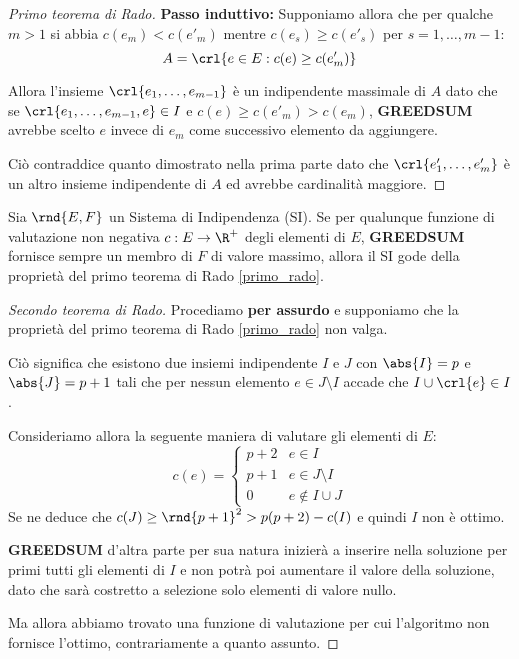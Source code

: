 \documentclass[\main/main.tex]{subfiles}
\begin{document}
\begin{proof}[Primo teorema di Rado]
  \textbf{Passo induttivo:} Supponiamo allora che per qualche \(m>1\) si abbia \(c(e_m) < c(e'_m)\) mentre \(c(e_s) \geq c(e'_s)\) per \(s = 1, \ldots, m-1\):
  \[A = \crl{e \in E: c(e) \geq c(e'_m)}\]

  Allora l'insieme \(\crl{e_1, \ldots, e_{m-1}}\) è un indipendente massimale di \(A\) dato che se \(\crl{e_1, \ldots, e_{m-1}, e} \in I\) e \(c(e) \geq c(e'_m) > c(e_m)\), \textbf{GREEDSUM} avrebbe scelto \(e\) invece di \(e_m\) come successivo elemento da aggiungere.

  Ciò contraddice quanto dimostrato nella prima parte dato che \(\crl{e'_1, \ldots, e'_m}\) è un altro insieme indipendente di \(A\) ed avrebbe cardinalità maggiore.
\end{proof}
\begin{theorem}
  Sia \(\rnd{E, F}\) un Sistema di Indipendenza (SI). Se per qualunque funzione di valutazione non negativa \(c: E \rightarrow \R^+\) degli elementi di \(E\), \textbf{GREEDSUM} fornisce sempre un membro di \(F\) di valore massimo, allora il SI gode della proprietà del primo teorema di Rado \ref{primo_rado}.
\end{theorem}
\begin{proof}[Secondo teorema di Rado]
  Procediamo \textbf{per assurdo} e supponiamo che la proprietà del primo teorema di Rado \ref{primo_rado} non valga.

  Ciò significa che esistono due insiemi indipendente \(I\) e \(J\) con \(\abs{I} = p\) e \(\abs{J} = p+1\) tali che per nessun elemento \(e \in J \setminus I\) accade che \(I \cup \crl{e} \in I\).

  Consideriamo allora la seguente maniera di valutare gli elementi di \(E\):
  \[
    c(e) = \begin{cases}
      p+2 & e \in I            \\
      p+1 & e \in J\setminus I \\
      0   & e \not\in I \cup J
    \end{cases}
  \]
  Se ne deduce che \(c(J) \geq \rnd{p+1}^2 > p(p+2) - c(I)\) e quindi \(I\) non è ottimo.

  \textbf{GREEDSUM} d'altra parte per sua natura inizierà a inserire nella soluzione per primi tutti gli elementi di \(I\) e non potrà poi aumentare il valore della soluzione, dato che sarà costretto a selezione solo elementi di valore nullo.

  Ma allora abbiamo trovato una funzione di valutazione per cui l'algoritmo non fornisce l'ottimo, contrariamente a quanto assunto.
\end{proof}
\end{document}

